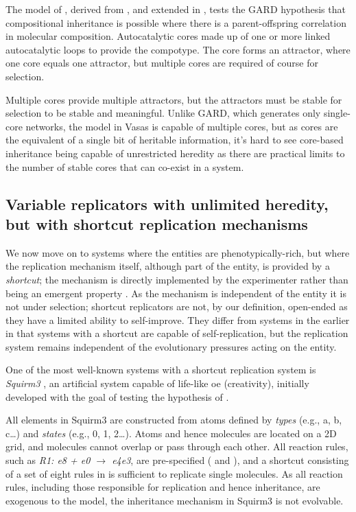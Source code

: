 The model of \textcite{Vasas2012}, derived from \textcite{Farmer1986}, and extended in \textcite{Vasas2012a, Vasas2012a}, tests the GARD hypothesis that compositional inheritance is possible where there is a parent-offspring correlation in molecular composition. Autocatalytic cores made up of one or more linked autocatalytic loops to provide the compotype. The core forms an attractor, where one core equals one attractor, but multiple cores are required of course for selection.

Multiple cores provide multiple attractors, but the attractors must be stable for selection to be stable and meaningful. Unlike GARD, which generates only single-core networks, the model in Vasas is capable of multiple cores, but as cores are the equivalent of a single bit of heritable information, it's hard to see core-based inheritance being capable of unrestricted heredity as there are practical limits to the number of stable cores that can co-exist in a system. 

\subsection{Variable replicators with unlimited heredity, but with shortcut replication mechanisms}

We now move on to systems where the entities are phenotypically-rich, but where the replication mechanism itself, although part of the entity, is provided by a \emph{shortcut}; the mechanism is directly implemented by the experimenter rather than being an emergent property \parencite{BanzhafBaumgaertnerBeslonEtAl2016}. As the mechanism is independent of the entity it is not under selection; shortcut replicators are not, by our definition, open-ended as they have a limited ability to self-improve. They differ from systems in the earlier  in that systems with a shortcut are capable of self-replication, but the replication system remains independent of the evolutionary pressures acting on the entity.

One of the most well-known systems with a shortcut replication system is \emph{Squirm3} \parencite{Hutton2007,Hutton2002}, an artificial system capable of life-like \gls{oe} (creativity), initially developed with the goal of testing the hypothesis of \textcite{Taylor2001} \parencite[p.341]{Hutton2002}.

All elements in Squirm3 are constructed from atoms defined by \emph{types} (e.g., a, b, c\dots) and \emph{states} (e.g., 0, 1, 2\dots). Atoms and hence molecules are located on a 2D grid, and molecules cannot overlap or pass through each other. All reaction rules, such as \emph{R1: e8 + e0 $\rightarrow$ e4e3}, are pre-specified (\textcite[p.4]{Hutton2007} and \textcite[p.49]{Faulconbridge2011}), and a shortcut consisting of a set of eight rules in \textcite{Hutton2002} is sufficient to replicate single molecules. As all reaction rules, including those responsible for replication and hence inheritance, are exogenous to the model, the inheritance mechanism in Squirm3 is not evolvable. 

